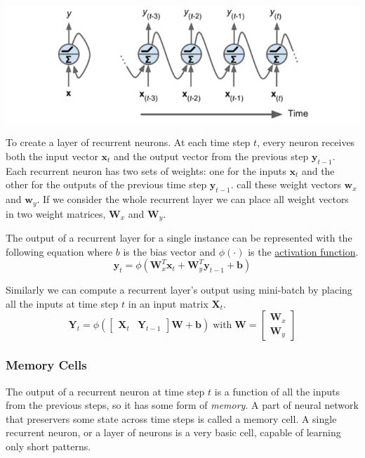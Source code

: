 \documentclass[12pt]{article}
\begin{document}
        \begin{center}
            \includegraphics[scale=0.65]{RecurrentNeuron}
        \end{center}

        To create a layer of recurrent neurons. At each time step $t$, every neuron receives both the input vector $\boldsymbol{x}_t$
        and the output vector from the previous step $\boldsymbol{y}_{t-1}$. Each recurrent neuron has two sets of weights: one for
        the inputs $\boldsymbol{x}_t$ and the other for the outputs of the previous time step $\boldsymbol{y}_{t-1}$.
        call these weight vectors $\boldsymbol{w}_x$ and $\boldsymbol{w}_y$. If we consider the whole recurrent layer we
        can place all weight vectors in two weight matrices, $\boldsymbol{W}_x$ and $\boldsymbol{W}_y$. 

        The output of a recurrent layer for a single instance can be represented with the following equation where $b$
        is the bias vector and $\phi(\cdot)$ is the \hyperref[sec:ActivationFunction]{activation function}.
        $$ \boldsymbol{y}_t = \phi(\boldsymbol{W}_x^T \boldsymbol{x}_t + \boldsymbol{W}_y^T \boldsymbol{y}_{t-1} + \boldsymbol{b}) $$

        Similarly we can compute a recurrent layer's output using mini-batch by placing all the inputs at time step $t$
        in an input matrix $\boldsymbol{X}_t$.
        $$ \boldsymbol{Y}_t = \phi( \begin{bmatrix} \boldsymbol{X}_t & \boldsymbol{Y}_{t-1} \end{bmatrix} \boldsymbol{W}
        + \boldsymbol{b}) \; \text{with} \; \boldsymbol{W} = \begin{bmatrix} \boldsymbol{W}_x \\ \boldsymbol{W}_y
        \end{bmatrix} $$
        
        \subsubsection{Memory Cells}
            The output of a recurrent neuron at time step $t$ is a function of all the inputs from the previous steps,
            so it has some form of \textit{memory}. A part of neural network that preservers some state across time
            steps is called a memory cell. A single recurrent neuron, or a layer of neurons is a very basic cell,
            capable of learning only short patterns.
\end{document}
